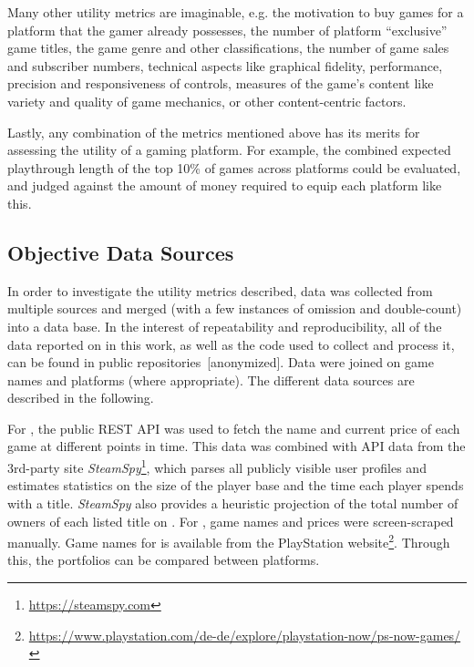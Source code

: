 Many other utility metrics are imaginable, e.g.
the motivation to buy games for a platform that the gamer already
possesses,
the number of platform ``exclusive'' game titles,
the game genre and other classifications,
the number of game sales and subscriber numbers,
technical aspects like graphical fidelity, performance, precision
and responsiveness of controls,
measures of the game's content like variety and quality of game mechanics,
or other content-centric factors.

Lastly, any combination of the metrics mentioned above has its
merits for assessing the utility of a gaming platform. For example,
the combined expected playthrough length of the top 10\% of games
across platforms could be evaluated, and judged against the amount
of money required to equip each platform like this.

\subsection{Objective Data Sources}
In order to investigate the utility metrics described, data was collected from
multiple sources and merged (with a few instances of omission and
double-count) into a data base. In the interest of repeatability and
reproducibility, all of the data reported on in this work, as well as
the code used to collect and process it, can be found in public
repositories~[anonymized].
Data were joined on game names and platforms (where appropriate).
The different data sources are described in the following.

For \steam, the public \acrshort{REST} \acrshort{API} was used to
fetch the name and current price of each game at different points in
time.
This
data was combined with \acrshort{API} data from the 3rd-party site
\textit{SteamSpy}\footnote{\url{https://steamspy.com}}, which parses all
publicly visible \steam user profiles and
estimates statistics on the size of the player base and the time each
player spends with a title. \textit{SteamSpy} also provides a heuristic
projection of the total number of owners of each listed title on \steam.
For \gfnow, game names and prices were screen-scraped manually.
Game names for \psnow is available from the PlayStation
website\footnote{\url{https://www.playstation.com/de-de/explore/playstation-now/ps-now-games/}}.
Through this, the portfolios can be compared between platforms.


